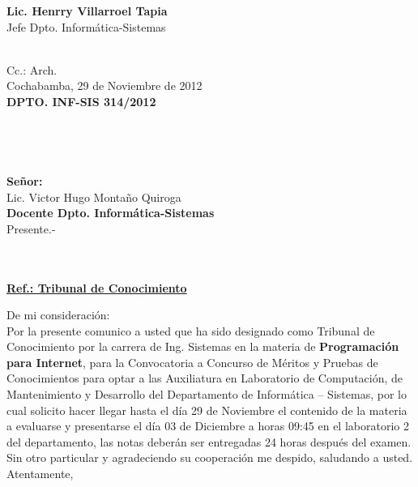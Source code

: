 \documentclass[letterpaper,11pt]{letter}
\begin{document}
\vspace{3.5cm}
\begin{center}
\begin{minipage}[b]{0.5\textwidth}
\begin{center}
{\bf Lic. Henrry Villarroel Tapia}\\
Jefe Dpto. Informática-Sistemas\\
\end{center}
\end{minipage}
\end{center}
~\\
Cc.: Arch.\\
\newpage
Cochabamba, 29 de Noviembre de 2012~\\
 \textbf{DPTO. INF-SIS 314/2012}\\
~\\
~\\
~\\
~\\
 \textbf{Señor:}~\\
Lic. Victor Hugo Montaño Quiroga~\\
 \textbf{Docente Dpto. Informática-Sistemas}~\\
Presente.-\\
~\\
~\\
\begin{center}
\underline{ \textbf{Ref.: Tribunal de Conocimiento}}
\end{center}
De mi consideración:\\
Por la presente comunico a usted que ha sido designado como Tribunal de Conocimiento por la carrera de Ing. Sistemas en la materia de \textbf{Programación para Internet}, para la Convocatoria a Concurso de Méritos y Pruebas de Conocimientos para optar a las Auxiliatura en Laboratorio de Computación, de Mantenimiento y Desarrollo del Departamento de Informática – Sistemas, por lo cual solicito hacer llegar hasta el día 29 de Noviembre el contenido de la materia a evaluarse y presentarse el día 03 de Diciembre a horas 09:45 en el laboratorio 2 del departamento, las notas deberán ser entregadas 24 horas después del examen.\\
Sin otro particular y agradeciendo su cooperación me despido, saludando a usted.\\
Atentamente,\\
\end{document}
